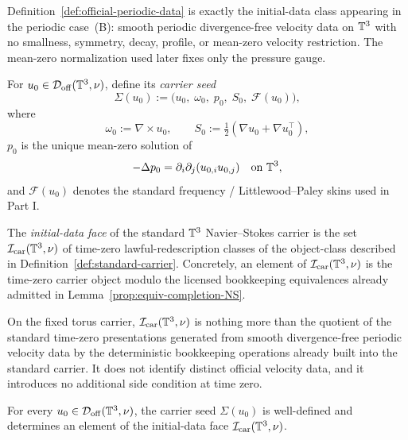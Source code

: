 \begin{remark}\label{rem:exact-match-fefferman-B}
Definition~\ref{def:official-periodic-data} is exactly the initial-data class appearing in the
periodic case~(B): smooth periodic divergence-free velocity data on $\mathbb{T}^3$ with no smallness,
symmetry, decay, profile, or mean-zero velocity restriction. The mean-zero normalization used later
fixes only the pressure gauge.
\end{remark}

\begin{definition}\label{def:carrier-seed}
For $u_0\in\mathcal D_{\mathrm{off}}(\mathbb{T}^3,\nu)$, define its \emph{carrier seed}
\[
\Sigma(u_0):=
\bigl(
 u_0,\;
 \omega_0,\;
 p_0,\;
 S_0,\;
 \mathcal F(u_0)
\bigr),
\]
where
\[
\omega_0:=\nabla\times u_0,\qquad
S_0:=\tfrac12(\nabla u_0+\nabla u_0^\top),
\]
$p_0$ is the unique mean-zero solution of
\[
-\Delta p_0=\partial_i\partial_j(u_{0,i}u_{0,j})\quad\text{on }\mathbb{T}^3,
\]
and $\mathcal F(u_0)$ denotes the standard frequency / Littlewood--Paley skins used in Part I.
\end{definition}

\begin{definition}\label{def:initial-data-face}
The \emph{initial-data face} of the standard $\mathbb{T}^3$ Navier--Stokes carrier is the set
$\mathcal I_{\mathrm{car}}(\mathbb{T}^3,\nu)$ of time-zero lawful-redescription classes of the object-class
described in Definition~\ref{def:standard-carrier}. Concretely, an element of
$\mathcal I_{\mathrm{car}}(\mathbb{T}^3,\nu)$ is the time-zero carrier object modulo the licensed
bookkeeping equivalences already admitted in Lemma~\ref{prop:equiv-completion-NS}.
\end{definition}

\begin{remark}\label{rem:initial-data-face-conventional}
On the fixed torus carrier, $\mathcal I_{\mathrm{car}}(\mathbb{T}^3,\nu)$ is nothing more than the quotient
of the standard time-zero presentations generated from smooth divergence-free periodic velocity data
by the deterministic bookkeeping operations already built into the standard carrier. It does not
identify distinct official velocity data, and it introduces no additional side condition at time zero.
\end{remark}

\begin{lemma}\label{lem:canonical-skin-completion}
For every $u_0\in\mathcal D_{\mathrm{off}}(\mathbb{T}^3,\nu)$, the carrier seed $\Sigma(u_0)$ is well-defined
and determines an element of the initial-data face
$\mathcal I_{\mathrm{car}}(\mathbb{T}^3,\nu)$.
\end{lemma}


